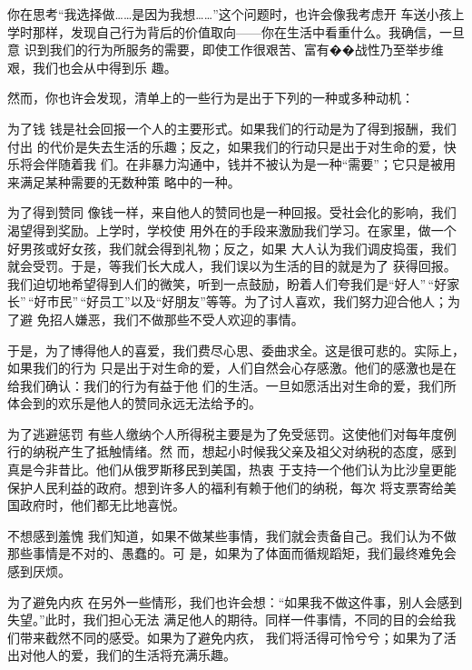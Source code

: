\documentclass{ctexart}
\newcounter{edesc}
\begin{document}
你在思考``我选择做\ldots \ldots 是因为我想\ldots \ldots ''这个问题时，也许会像我考虑开
车送小孩上学时那样，发现自己行为背后的价值取向------你在生活中看重什么。我确信，一旦意
识到我们的行为所服务的需要，即使工作很艰苦、富有��战性乃至举步维艰，我们也会从中得到乐
趣。

然而，你也许会发现，清单上的一些行为是出于下列的一种或多种动机：

\begin{edesc}
	\item[为了钱]
	钱是社会回报一个人的主要形式。如果我们的行动是为了得到报酬，我们付出
	的代价是失去生活的乐趣；反之，如果我们的行动只是出于对生命的爱，快乐将会伴随着我
	们。在非暴力沟通中，钱并不被认为是一种``需要''；它只是被用来满足某种需要的无数种策
	略中的一种。
	\item[为了得到赞同]
	像钱一样，来自他人的赞同也是一种回报。受社会化的影响，我们渴望得到奖励。上学时，学校使
	用外在的手段来激励我们学习。在家里，做一个好男孩或好女孩，我们就会得到礼物；反之，如果
	大人认为我们调皮捣蛋，我们就会受罚。于是，等我们长大成人，我们误以为生活的目的就是为了
	获得回报。我们迫切地希望得到人们的微笑，听到一点鼓励，盼着人们夸我们是``好人''\,``好家
	长''\,``好市民''\,``好员工''以及``好朋友''等等。为了讨人喜欢，我们努力迎合他人；为了避
	免招人嫌恶，我们不做那些不受人欢迎的事情。

	于是，为了博得他人的喜爱，我们费尽心思、委曲求全。这是很可悲的。实际上，如果我们的行为
	只是出于对生命的爱，人们自然会心存感激。他们的感激也是在给我们确认：我们的行为有益于他
	们的生活。一旦如愿活出对生命的爱，我们所体会到的欢乐是他人的赞同永远无法给予的。

	\item[为了逃避惩罚]
	有些人缴纳个人所得税主要是为了免受惩罚。这使他们对每年度例行的纳税产生了抵触情绪。然
	而，想起小时候我父亲及祖父对纳税的态度，感到真是今非昔比。他们从俄罗斯移民到美国，热衷
	于支持一个他们认为比沙皇更能保护人民利益的政府。想到许多人的福利有赖于他们的纳税，每次
	将支票寄给美国政府时，他们都无比地喜悦。

	\item[不想感到羞愧]
	我们知道，如果不做某些事情，我们就会责备自己。我们认为不做那些事情是不对的、愚蠢的。可
	是，如果为了体面而循规蹈矩，我们最终难免会感到厌烦。

	\item[为了避免内疚]
	在另外一些情形，我们也许会想：``如果我不做这件事，别人会感到失望。''此时，我们担心无法
	满足他人的期待。同样一件事情，不同的目的会给我们带来截然不同的感受。如果为了避免内疚，
	我们将活得可怜兮兮；如果为了活出对他人的爱，我们的生活将充满乐趣。


\end{edesc}
\end{document}
